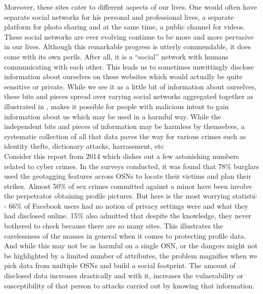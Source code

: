 \documentclass[12pt,conference]{IEEEtran}
\begin{document}
Moreover, these sites cater to different aspects of our lives. One would often have separate social networks for his personal and professional lives, a separate platform for photo sharing and at the same time, a public channel for videos. These social networks are ever evolving continue to be more and more pervasive in our lives. Although this remarkable progress is utterly commendable, it does come with its own perils. After all, it is a ``social'' network with humans communicating with each other. This leads us to sometimes unwittingly disclose information about ourselves on these websites which would actually be quite sensitive or private. While we see it as a little bit of information about ourselves, these bits and pieces spread over varying social networks aggregated together as illustrated in \cite{privacypaper}, makes it possible for people with malicious intent to gain information about us which may be used in a harmful way. While the independent bits and pieces of information may be harmless by themselves, a systematic collection of all that data paves the way for various crimes such as identity thefts, dictionary attacks, harrassment, etc\\

Consider this report\cite{newsarticle} from 2014 which dishes out a few astonishing numbers related to cyber crimes. In the surveys conducted, it was found that 78\% burglars used the geotagging features across OSNs to locate their victims and plan their strikes. Almost 50\% of sex crimes committed against a minor have been involve the perpetrator obtaining profile pictures. But here is the most worrying statistic - 66\% of Facebook users had no notion of privacy settings were and what they had disclosed online. 15\% also admitted that despite the knowledge, they never bothered to check because there are so many sites. This illustrates the carelessness of the masses in general when it comes to protecting profile data. And while this may not be as harmful on a single OSN, or the dangers might not be highlighted by a limited number of attributes, the problem magnifies when we pick data from multiple OSNs and build a social footprint. The amount of disclosed data increases drastically and with it, increases the vulnerability or susceptibility of that person to attacks carried out by knowing that information.\\
\end{document}
